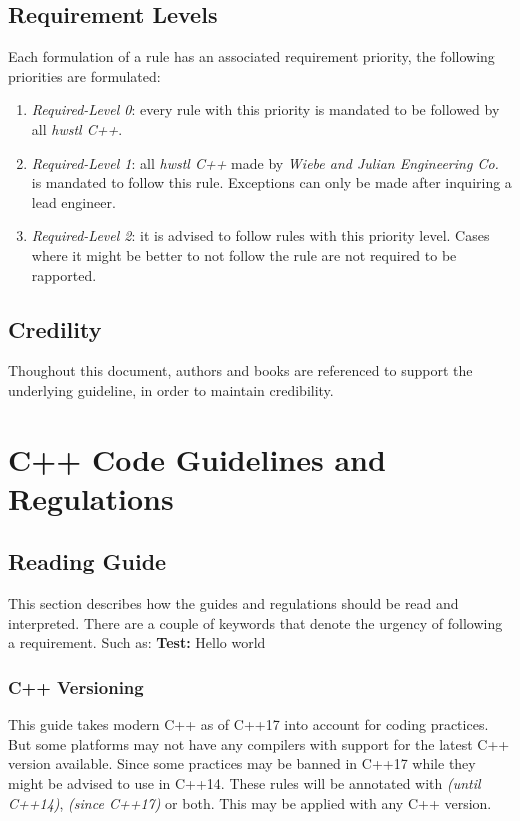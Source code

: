 \documentclass[12pt]{article}
\newcommand{\cppuntil}[1]{\footnotesize\textit{(until C++#1)}\normalsize}
\newcommand{\cppsince}[1]{\footnotesize\textit{(since C++#1)}\normalsize}
\newcommand{\requirementpriority}[1]{\emph{Required-Level #1}}
\begin{document}
\subsection{Requirement Levels}
Each formulation of a rule has an associated requirement priority, the
following priorities are formulated:
\begin{enumerate}
   \item \requirementpriority{0}: every rule with this priority is mandated to
be followed by all \textit{hwstl C++}.
   \item \requirementpriority{1}: all \textit{hwstl C++} made by \textit{Wiebe
and Julian Engineering Co.} is mandated to follow this rule. Exceptions can
only be made after inquiring a lead engineer.
   \item \requirementpriority{2}: it is advised to follow rules with this
priority level. Cases where it might be better to not follow the rule are not
required to be rapported.
\end{enumerate}

\subsection{Credility}
Thoughout this document, authors and books are referenced to support the
underlying guideline, in order to maintain credibility.
\newpage
\section{C++ Code Guidelines and Regulations}
\subsection{Reading Guide}
This section describes how the guides and regulations should be read and
interpreted. There are a couple of keywords that denote the urgency of
following a requirement. Such as:
\bigbreak
\textbf{Test:} Hello world
\subsubsection{C++ Versioning}
This guide takes modern C++ as of C++17 into account for coding practices. But
some platforms may not have any compilers with support for the latest C++
version available. Since some practices may be banned in C++17 while they might
be advised to use in C++14. These rules will be annotated with \cppuntil{14},
\cppsince{17} or both. This may be applied with any C++ version.

\newpage
\printbibliography

\newpage
\begin{appendix}
\end{appendix}
\end{document}
